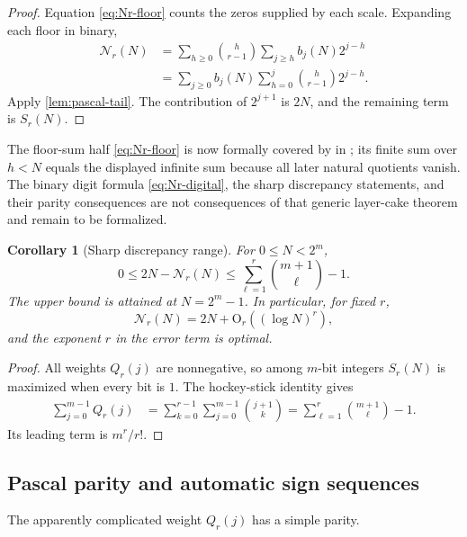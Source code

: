 \documentclass[11pt,a4paper]{article}
\theoremstyle{frontier}
\newtheorem{corollary}[theorem]{Corollary}
\theoremstyle{definition}
\newcommand{\bigO}{\mathrm O}
\begin{document}
\begin{proof}
Equation \eqref{eq:Nr-floor} counts the zeros supplied by each scale.  Expanding each floor in binary,
\begin{align*}
 \mathcal N_r(N)
 &=\sum_{h\ge0}\binom h{r-1}\sum_{j\ge h}b_j(N)2^{j-h}\\
 &=\sum_{j\ge0}b_j(N)
   \sum_{h=0}^{j}\binom h{r-1}2^{j-h}.
\end{align*}
Apply \cref{lem:pascal-tail}.  The contribution of $2^{j+1}$ is $2N$, and the remaining term is $S_r(N)$.
\end{proof}

The floor-sum half \eqref{eq:Nr-floor} is now formally covered by
 in
; its finite sum over $h<N$ equals the
displayed infinite sum because all later natural quotients vanish.  The
binary digit formula \eqref{eq:Nr-digital}, the sharp discrepancy statements,
and their parity consequences are not consequences of that generic layer-cake
theorem and remain to be formalized.

\begin{corollary}[Sharp discrepancy range]\label{cor:discrepancy-range}
For $0\le N<2^m$,
\begin{equation}\label{eq:discrepancy-bound}
 0\le 2N-\mathcal N_r(N)
 \le \sum_{\ell=1}^{r}\binom{m+1}{\ell}-1.
\end{equation}
The upper bound is attained at $N=2^m-1$.  In particular, for fixed $r$,
\[
  \mathcal N_r(N)=2N+\bigO_r((\log N)^r),
\]
and the exponent $r$ in the error term is optimal.
\end{corollary}

\begin{proof}
All weights $Q_r(j)$ are nonnegative, so among $m$-bit integers $S_r(N)$ is maximized when every bit is $1$.  The hockey-stick identity gives
\begin{align*}
 \sum_{j=0}^{m-1}Q_r(j)
 &=\sum_{k=0}^{r-1}\sum_{j=0}^{m-1}\binom{j+1}{k}
 =\sum_{\ell=1}^{r}\binom{m+1}{\ell}-1.
\end{align*}
Its leading term is $m^r/r!$.
\end{proof}

\subsection{Pascal parity and automatic sign sequences}

The apparently complicated weight $Q_r(j)$ has a simple parity.
\end{document}
